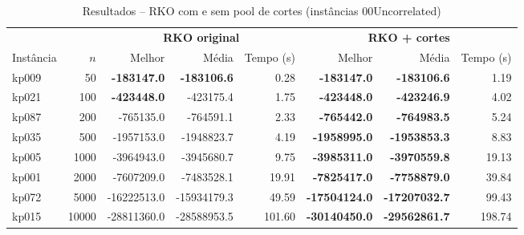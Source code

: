 \begin{table}[htbp]
\centering
\caption{Resultados -- RKO com e sem pool de cortes (instâncias 00Uncorrelated)}
\label{tab:cuts}
\begin{tabular}{lrrrrrrr}
\toprule
 & & \multicolumn{3}{c}{\textbf{RKO original}} & \multicolumn{3}{c}{\textbf{RKO + cortes}} \\
\cmidrule(lr){3-5} \cmidrule(lr){6-8}
Instância & $n$ & Melhor & Média & Tempo (s) & Melhor & Média & Tempo (s) \\
\midrule
kp009 & 50 & \textbf{-183147.0} & \textbf{-183106.6} & 0.28 & \textbf{-183147.0} & \textbf{-183106.6} & 1.19 \\
kp021 & 100 & \textbf{-423448.0} & -423175.4 & 1.75 & \textbf{-423448.0} & \textbf{-423246.9} & 4.02 \\
kp087 & 200 & -765135.0 & -764591.1 & 2.33 & \textbf{-765442.0} & \textbf{-764983.5} & 5.24 \\
kp035 & 500 & -1957153.0 & -1948823.7 & 4.19 & \textbf{-1958995.0} & \textbf{-1953853.3} & 8.83 \\
kp005 & 1000 & -3964943.0 & -3945680.7 & 9.75 & \textbf{-3985311.0} & \textbf{-3970559.8} & 19.13 \\
kp001 & 2000 & -7607209.0 & -7483528.1 & 19.91 & \textbf{-7825417.0} & \textbf{-7758879.0} & 39.84 \\
kp072 & 5000 & -16222513.0 & -15934179.3 & 49.59 & \textbf{-17504124.0} & \textbf{-17207032.7} & 99.43 \\
kp015 & 10000 & -28811360.0 & -28588953.5 & 101.60 & \textbf{-30140450.0} & \textbf{-29562861.7} & 198.74 \\
\bottomrule
\end{tabular}
\end{table}
